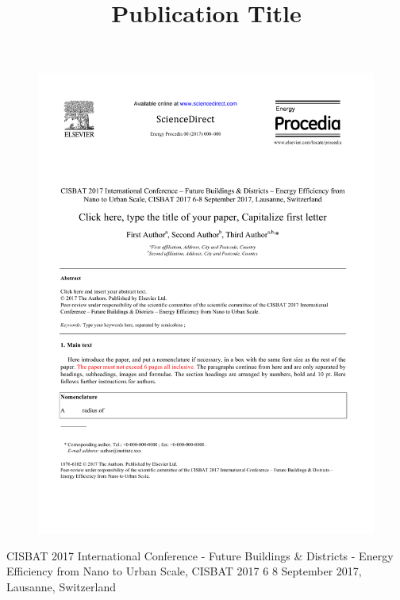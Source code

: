\documentclass[preprint,11pt,3p]{elsarticle} %
\begin{document}
\begin{frontmatter}

\begin{figure}
\begin{center}
\includegraphics[width=\columnwidth, trim= 0cm 0cm 0cm 0cm,clip]{HeaderEP.pdf}
\label{fig:header}
\end{center}
\end{figure}

\begin{center}
{CISBAT 2017 International Conference - Future Buildings \& Districts - Energy Efficiency from Nano to Urban Scale, CISBAT 2017 6 8 September 2017, Lausanne, Switzerland}
\end{center}

\title{Publication Title} 



\end{frontmatter}
\end{document}
